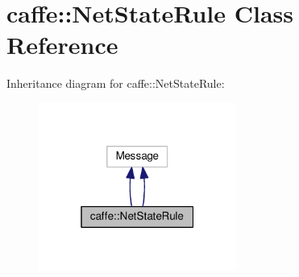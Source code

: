\hypertarget{classcaffe_1_1_net_state_rule}{}\section{caffe\+:\+:Net\+State\+Rule Class Reference}
\label{classcaffe_1_1_net_state_rule}


Inheritance diagram for caffe\+:\+:Net\+State\+Rule\+:
\nopagebreak
\begin{figure}[H]
\begin{center}
\leavevmode
\includegraphics[width=184pt]{classcaffe_1_1_net_state_rule__inherit__graph}
\end{center}
\end{figure}
